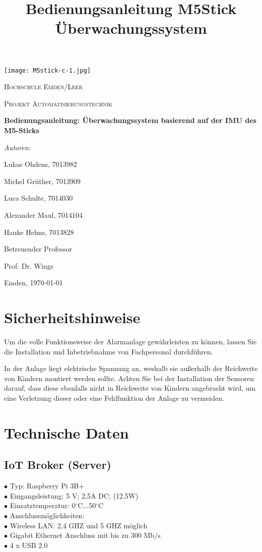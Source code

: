 \documentclass[a4paper,12pt]{article}
\title{Bedienungsanleitung M5Stick Überwachungssystem}
\begin{document}
\begin{titlepage}
	\centering
	\texttt{[image: M5stick-c-1.jpg]}\par\vspace{1cm}
	{\scshape\LARGE Hochschule Emden/Leer \par}
	\vspace{1cm}
	{\scshape\Large Projekt Automatisierungstechnik\par}
	\vspace{1.5cm}
	{\huge\bfseries Bedienungsanleitung: Überwachungssystem basierend
	auf der IMU des
	M5-Sticks\par}
	\vspace{2cm}
	{\Large\itshape Autoren:\par {Lukas Ohdens, 7013982\par
	Michel Grüther, 7013909\par Luca Schulte, 7014030\par Alexander
	Maul, 7014104\par Hauke Helms, 7013828}\par}
	\vfill
	Betreuender Professor\par
	Prof. Dr. Wings

	\vfill

	{\large Emden, \today\par}
\end{titlepage}

\tableofcontents
\newpage

\section{Sicherheitshinweise}
Um die volle Funktionsweise der Alarmanlage gewährleisten zu können, lassen Sie die Installation und Inbetriebnahme von Fachpersonal durchführen.\par
In der Anlage liegt elektrische Spannung an, weshalb sie außerhalb der Reichweite von Kindern montiert werden sollte. Achten Sie bei der Installation der Sensoren darauf, dass diese ebenfalls nicht in Reichweite von Kindern angebracht wird, um eine Verletzung dieser oder eine Fehlfunktion der Anlage zu vermeiden.

	\section{Technische Daten}
	\subsection{IoT Broker (Server)}
	$\bullet$ Typ: Raspberry Pi 3B+\\ 
	$\bullet$ Eingangsleistung: 5 V; 2,5A DC; (12,5W) \\
	$\bullet$ Einsatztemperatur: 0$^\circ$C$\dots$50$^\circ$C \\ 
	$\bullet$ Anschlussmöglichkeiten: \\
	$\bullet$ Wireless LAN: 2,4 GHZ und 5 GHZ möglich\\ 
	$\bullet$ Gigabit Ethernet Anschluss mit bis zu 300 Mb/s \\
	$\bullet$ 4 x USB 2.0 
	
\end{document}
